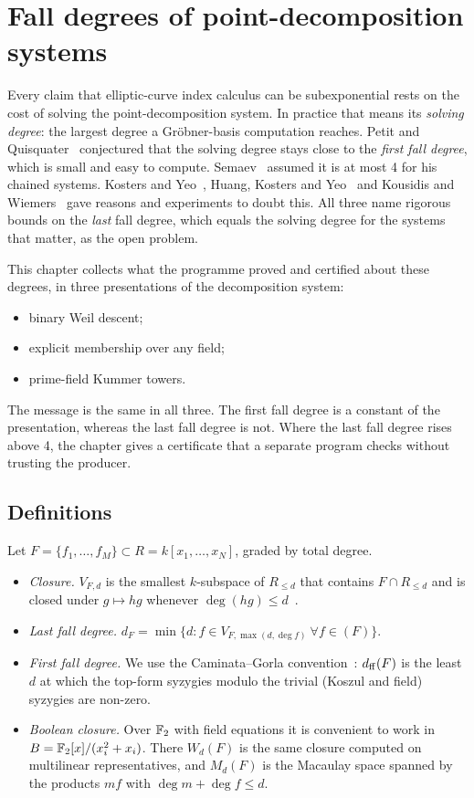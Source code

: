 \chapter{Fall degrees of point-decomposition systems}\label{ch:falldegree}

Every claim that elliptic-curve index calculus can be subexponential rests
on the cost of solving the point-decomposition system. In practice that
means its \emph{solving degree}: the largest degree a Gröbner-basis
computation reaches. Petit and Quisquater~\cite{petit2012} conjectured that
the solving degree stays close to the \emph{first fall degree}, which is
small and easy to compute. Semaev~\cite{semaev2015} assumed it is at
most 4 for his chained systems. Kosters and Yeo~\cite{kosters2015notes},
Huang, Kosters and Yeo~\cite{hky2015} and Kousidis and
Wiemers~\cite{kousidis2019} gave reasons and experiments to doubt this. All
three name rigorous bounds on the \emph{last} fall degree, which equals the
solving degree for the systems that matter, as the open problem.

This chapter collects what the programme proved and certified about these
degrees, in three presentations of the decomposition system:
\begin{itemize}
\item binary Weil descent;
\item explicit membership over any field;
\item prime-field Kummer towers.
\end{itemize}
The message is the same in all three. The first fall degree is a constant
of the presentation, whereas the last fall degree is not. Where the last
fall degree rises above 4, the chapter gives a certificate that a separate
program checks without trusting the producer.

\section{Definitions}\label{sec:fd-defs}

Let $F=\{f_1,\ldots,f_M\}\subset R=k[x_1,\ldots,x_N]$, graded by total
degree.
\begin{itemize}
\item \emph{Closure.} $V_{F,d}$ is the smallest $k$-subspace of $R_{\le d}$
  that contains $F\cap R_{\le d}$ and is closed under $g\mapsto hg$
  whenever $\deg(hg)\le d$~\cite{hky2015,caminata2023}.
\item \emph{Last fall degree.} $d_F=\min\{d: f\in V_{F,\max(d,\deg f)}\
  \forall f\in(F)\}$.
\item \emph{First fall degree.} We use the Caminata--Gorla
  convention~\cite{caminata2023}: $d_{\rm ff}(F)$ is the least $d$ at
  which the top-form syzygies modulo the trivial (Koszul and field)
  syzygies are non-zero.
\item \emph{Boolean closure.} Over $\mathbb{F}_2$ with field equations it is
  convenient to work in $B=\mathbb{F}_2[x]/(x_i^2+x_i)$. There $W_d(F)$ is the
  same closure computed on multilinear representatives, and $M_d(F)$ is
  the Macaulay space spanned by the products $mf$ with
  $\deg m+\deg f\le d$.
\end{itemize}

